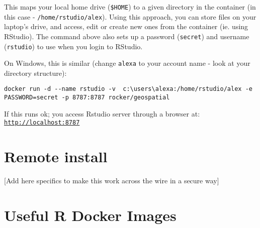 \documentclass[
]{book}
\begin{document}
This maps your local home drive (\texttt{\$HOME}) to a given directory in the container (in this case - \texttt{/home/rstudio/alex}).
Using this approach, you can store files on your laptop's drive, and access, edit or create new ones from the container (ie. using RStudio).
The command above also sets up a password (\texttt{secret}) and username (\texttt{rstudio})
to use when you login to RStudio.

On Windows, this is similar (change \texttt{alexa} to your account name - look at your directory structure):

\begin{verbatim}
docker run -d --name rstudio -v  c:\users\alexa:/home/rstudio/alex -e PASSWORD=secret -p 8787:8787 rocker/geospatial
\end{verbatim}

If this runs ok; you access Rstudio server through a browser at: \href{http://localhost:8787}{\texttt{http://localhost:8787}}

\hypertarget{remote-install-1}{%
\section{Remote install}\label{remote-install-1}}

{[}Add here specifics to make this work across the wire in a secure way{]}

\hypertarget{useful-r-docker-images}{%
\section{Useful R Docker Images}\label{useful-r-docker-images}}

  
\end{document}
